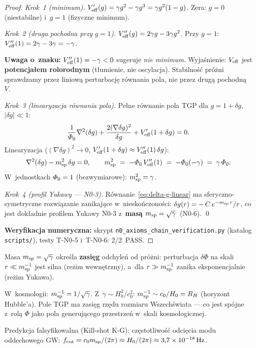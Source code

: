 \begin{proof}
\emph{Krok~1 (minimum).}
$V_{\rm eff}'(g) = \gamma g^2 - \gamma g^3 = \gamma g^2(1-g)$.
Zera: $g = 0$ (niestabilne) i~$g = 1$ (fizyczne minimum).

\emph{Krok~2 (druga pochodna przy $g=1$).}
$V_{\rm eff}''(g) = 2\gamma g - 3\gamma g^2$.
Przy $g = 1$:
$V_{\rm eff}''(1) = 2\gamma - 3\gamma = -\gamma$.

\noindent\textbf{Uwaga o~znaku:} $V_{\rm eff}''(1) = -\gamma < 0$
sugeruje \emph{nie minimum}. Wyja\'snienie: $V_{\rm eff}$
jest \textbf{potencja\l{}em rolorodnym} (t\l{}umienie, nie oscylacja).
Stabilno\'s\'c pr\'o\.zni sprawdzamy przez liniow\k{a}
perturbacj\k{e} r\'ownania pola, nie przez drugą pochodn\k{a}~$V$.

\emph{Krok~3 (linearyzacja r\'ownania pola).}
Pe\l{}ne r\'ownanie pola TGP dla $g = 1 + \delta g$, $|\delta g| \ll 1$:
\begin{equation}\label{eq:field-linearized}
  \frac{1}{\varPhi_0}\nabla^2(\delta g)
  + \frac{2(\nabla\delta g)^2}{\delta g}
  + V_{\rm eff}'(1+\delta g) = 0.
\end{equation}
Linearyzacja ($(\nabla\delta g)^2 \to 0$, $V_{\rm eff}'(1+\delta g) \approx
V_{\rm eff}''(1)\,\delta g$):
\begin{equation}\label{eq:delta-g-linear}
  \nabla^2(\delta g) - m_{\rm sp}^2\,\delta g = 0,
  \qquad
  m_{\rm sp}^2 \;=\; -\varPhi_0\,V_{\rm eff}''(1) \;=\; -\varPhi_0(-\gamma)
  \;=\; \gamma\,\varPhi_0.
\end{equation}
W~jednostkach $\varPhi_0 = 1$ (bezwymiarowe): $m_{\rm sp}^2 = \gamma$.

\emph{Krok~4 (profil Yukawy --- N0-3).}
R\'ownanie~\eqref{eq:delta-g-linear} ma sferyczno-symetryczne
rozwi\k{a}zanie zanikaj\k{a}ce w~niesko\'nczono\'sci:
$\delta g(r) = -\,C\,e^{-m_{\rm sp}\,r}/r$,
co jest dok\l{}adnie profilem Yukawy N0-3 z~\textbf{mas\k{a}
$m_{\rm sp} = \sqrt{\gamma}$}~(N0-6). \qed

\medskip\noindent
{\small \textbf{Weryfikacja numeryczna:} skrypt
\texttt{n0\_axioms\_chain\_verification.py}
(katalog \texttt{scripts/}), testy T-N0-5 i~T-N0-6: 2/2~PASS.}
\end{proof}

\begin{remark}\label{rem:msp-physics}
Masa $m_{\rm sp} = \sqrt{\gamma}$ okre\'sla \textbf{zasi\k{e}g}
odchyle\'n od pr\'o\.zni: perturbacja $\delta\Phi$ na skali
$r \ll m_{\rm sp}^{-1}$ jest silna (re\.zim wewn\k{e}trzny),
a~dla $r \gg m_{\rm sp}^{-1}$ zanika eksponencjalnie (re\.zim Yukawa).

W~kosmologii: $m_{\rm sp}^{-1} = 1/\sqrt{\gamma}$.
Z~$\gamma \sim H_0^2/c_0^2$: $m_{\rm sp}^{-1} \sim c_0/H_0 = R_H$
(horyzont Hubble'a). Pole TGP ma zasi\k{e}g rz\k{e}du rozmiaru
Wszech\'swiata --- co jest sp\'ojne z~rol\k{a} $\Phi$ jako
pola generuj\k{a}cego przestrze\'n w~skali kosmologicznej.

Predykcja falsyfikowalna (Kill-shot K-G): cz\k{e}stotliwo\'s\'c
odci\k{e}cia modu oddechowego GW:
$f_{\rm cut} = c_0 m_{\rm sp}/(2\pi) \approx H_0/(2\pi)
\approx 3{,}7 \times 10^{-18}\,\mathrm{Hz}$.
\end{remark}

